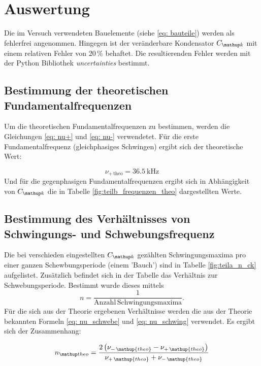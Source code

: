 \section{Auswertung}
Die im Versuch verwendeten Bauelemente (siehe \eqref{eq: bauteile})
werden als fehlerfrei angenommen.
Hingegen ist der veränderbare Kondensator $C\ua{k}$ mit
einem relativen Fehler von $20\,\%$ behaftet.
Die resultierenden Fehler werden mit der Python Bibliothek
\emph{uncertainties} bestimmt.

\subsection{Bestimmung der theoretischen Fundamentalfrequenzen}
Um die theoretischen Fundamentalfrequenzen zu bestimmen, werden die Gleichungen \eqref{eq: nu+} und
\eqref{eq: nu-} verwendetet.
Für die erste Fundamentalfrequenz (gleichphasiges Schwingen) ergibt sich der
theoretische Wert: %

\begin{equation}
\label{eq:nu_plu_theo}
\nu_{+\,\mathup{theo}}=\SI{36,5}{\kilo\hertz}
\end{equation}
Und für die gegenphasigen Fundamentalfrequenzen ergibt sich in Abhängigkeit von $C\ua{k}$ die in Tabelle \ref{fig:teilb_frequenzen_theo}  dargestellten Werte. %


\subsection{Bestimmung des Verhältnisses von Schwingungs- und Schwebungsfrequenz}
Die bei verschieden eingestellten $C\ua{k}$ gezählten Schwingungsmaxima pro einer ganzen %
Schewbungsperiode (einem 'Bauch') sind in Tabelle \ref{fig:teila_n_ck} aufgelistet. %
Zusätzlich befindet sich in der Tabelle das Verhältnis zur Schwebungsperiode. %
Bestimmt wurde dieses mittels %
\begin{equation*}
n=\frac{1}{\mathup{Anzahl \, Schwingungsmaxima}}.
\end{equation*}
Für die sich aus der Theorie ergebenen Verhältnisse werden die aus der Theorie 
bekannten Formeln \eqref{eq: nu_schwebe} und \eqref{eq: nu_schwing} verwendet.
Es ergibt sich der Zusammenhang:

\begin{equation*}
n\ua{theo}=\frac{2\left(\nu_{-\,\mathup{theo}}-\nu_{+\,\mathup{theo}}\right)}{\nu_{+\,\mathup{theo}}+\nu_{-\,\mathup{theo}}}
\end{equation*}


